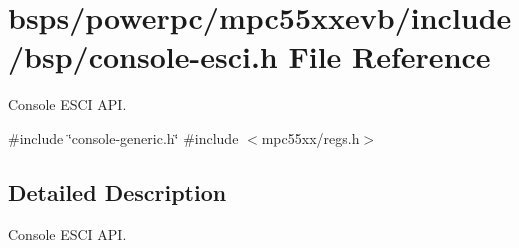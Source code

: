 \hypertarget{console-esci_8h}{}\section{bsps/powerpc/mpc55xxevb/include/bsp/console-\/esci.h File Reference}
\label{console-esci_8h}


Console E\+S\+CI A\+PI.  


{\ttfamily \#include \char`\"{}console-\/generic.\+h\char`\"{}}\newline
{\ttfamily \#include $<$mpc55xx/regs.\+h$>$}\newline


\subsection{Detailed Description}
Console E\+S\+CI A\+PI. 


